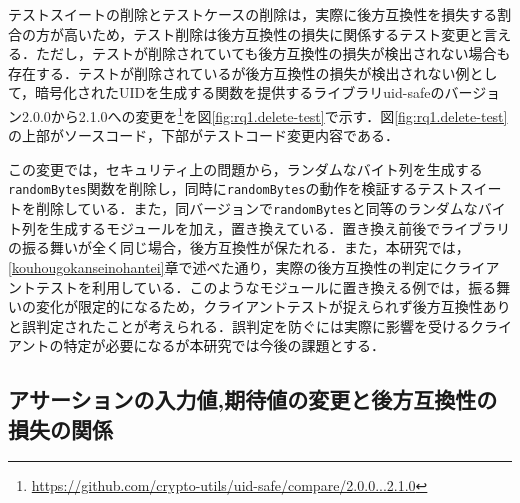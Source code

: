 \documentclass[11pt,dvipdfmx]{jreport}
\begin{document}
テストスイートの削除とテストケースの削除は，実際に後方互換性を損失する割合の方が高いため，テスト削除は後方互換性の損失に関係するテスト変更と言える．ただし，テストが削除されていても後方互換性の損失が検出されない場合も存在する．テストが削除されているが後方互換性の損失が検出されない例として，暗号化されたUIDを生成する関数を提供するライブラリuid-safeのバージョン2.0.0から2.1.0への変更を\footnote{\url{https://github.com/crypto-utils/uid-safe/compare/2.0.0...2.1.0}}を図\ref{fig:rq1.delete-test}で示す．図\ref{fig:rq1.delete-test}の上部がソースコード，下部がテストコード変更内容である．

この変更では，セキュリティ上の問題から，ランダムなバイト列を生成する{\verb|randomBytes|}関数を削除し，同時に{\verb|randomBytes|}の動作を検証するテストスイートを削除している．また，同バージョンで{\verb|randomBytes|}と同等のランダムなバイト列を生成するモジュールを加え，置き換えている．置き換え前後でライブラリの振る舞いが全く同じ場合，後方互換性が保たれる．また，本研究では，\ref{kouhougokanseinohantei}章で述べた通り，実際の後方互換性の判定にクライアントテストを利用している．このようなモジュールに置き換える例では，振る舞いの変化が限定的になるため，クライアントテストが捉えられず後方互換性ありと誤判定されたことが考えられる．誤判定を防ぐには実際に影響を受けるクライアントの特定が必要になるが本研究では今後の課題とする．

\subsection{アサーションの入力値,期待値の変更と後方互換性の損失の関係}
\end{document}
